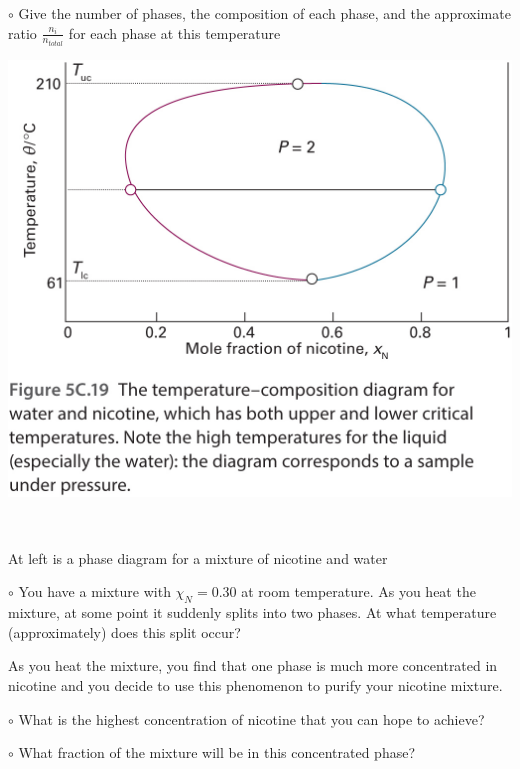 \documentclass[11pt, letterpaper]{memoir}
\begin{document}
{	\noindent $\circ$ Give the number of phases, the composition of each phase, and the approximate ratio $\frac{n_i}{n_{total}}$ for each phase at this temperature
	
\vspace{11em}\hspace{-4em}\noindent
\begin{minipage}{0.55\textwidth}
	\noindent\includegraphics[width=\linewidth]{Nicotine}
\end{minipage} ~~
\begin{minipage}{0.55\textwidth}
	\noindent At left is a phase diagram for a mixture of nicotine and water
	
	\noindent $\circ$ You have a mixture with $\chi_N = 0.30$ at room temperature. As you heat the mixture, at some point it suddenly splits into two phases. At what temperature (approximately) does this split occur?
	
	\vspace{1.5em}
	\noindent As you heat the mixture, you find that one phase is much more concentrated in nicotine and you decide to use this phenomenon to purify your nicotine mixture. 
	
	\noindent $\circ$ What is the highest concentration of nicotine that you can hope to achieve?
	
	\vspace{1.5em}
	\noindent $\circ$ What fraction of the mixture will be in this concentrated phase?
\end{minipage}
	
}
\end{document}
